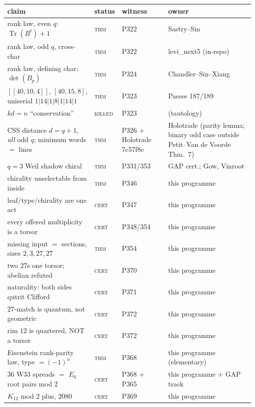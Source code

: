 \documentclass[12pt,a4paper]{article}
\def\texttt#1{#1}%
\def\cdot{ }%
\theoremstyle{definition}
\begin{document}
\begin{center}\small
\begin{tabular}{@{}p{}llp{}@{}}
\toprule
claim & status & witness & owner \\
\midrule
rank law, even $q$: $\operatorname{Tr}(B^t)+1$ & \textsc{thm} & P322 & Sastry--Sin \\
rank law, odd $q$, cross-char & \textsc{thm} & P322 & \texttt{levi\_next5} (in-repo) \\
rank law, defining char; $\det(B_p)$ & \textsc{thm} & P324 & Chandler--Sin--Xiang \\
$[[40,10,4]]$, $[40,15,8]$, uniserial $1|14|1|8|1|14|1$ & \textsc{thm} & P323 & Passes 187/189 \\
$k\cdot d=n$ ``conservation'' & \textsc{killed} & P323 & (tautology) \\
CSS distance $d=q{+}1$, \emph{all} odd $q$; minimum words $=$ lines & \textsc{thm} & P326 $+$ Holotrade \texttt{7c57f8e} & Holotrade (parity lemma; binary odd case outside Petit--Van de Voorde Thm.~7) \\
$q=3$ Weil shadow chiral & \textsc{thm} & P331/353 & GAP cert.; Gow, Vinroot \\
chirality unselectable from inside & \textsc{thm} & P346 & this programme \\
leaf/type/chirality are one act & \textsc{cert} & P347 & this programme \\
every offered multiplicity is a torsor & \textsc{cert} & P348/354 & this programme \\
missing input $=$ sections, sizes $2,3,27,27$ & \textsc{thm} & P354 & this programme \\
two $27$s one torsor; abelian refuted & \textsc{cert} & P370 & this programme \\
naturality: both sides qutrit Clifford & \textsc{cert} & P371 & this programme \\
$27$-match is quantum, not geometric & \textsc{cert} & P372 & this programme \\
rim $12$ is quartered, NOT a torsor & \textsc{cert} & P372 & this programme \\
Eisenstein rank-parity law, type $=(-1)^n$ & \textsc{thm} & P368 & this programme (elementary) \\
$36$ W33 spreads $=$ $E_6$ root pairs mod 2 & \textsc{cert} & P368 $+$ P365 & this programme $+$ GAP track \\
$K_{12}$ mod 2 plus, $2080$ & \textsc{cert} & P369 & this programme \\

\end{tabular}
\end{center}
\end{document}
